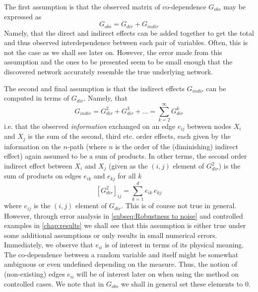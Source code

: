 \documentclass[../Thesis.tex]{subfiles}
\begin{document}
The first assumption is that the observed matrix of co-dependence $G_{obs}$ may be expressed as
\begin{equation}
    G_{obs} = G_{dir} + G_{indir}
\end{equation}
Namely, that the direct and indirect effects can be added together to get the total and thus observed interdependence between each pair of variables. Often, this is not the case as we shall see later on. However, the error made from this assumption and the ones to be presented seem to be small enough that the discovered network accurately resemble the true underlying network.

The second and final assumption is that the indirect effects $G_{indir}$ can be computed in terms of $G_{dir}$. Namely, that
\begin{equation}
    G_{indir} = G_{dir}^2 + G_{dir}^3 + \dots = \sum_{k = 2}^{\infty} G_{dir}^k
\end{equation}
i.e. that the observed \textit{information} exchanged on an edge $e_{ij}$ between nodes $X_i$ and $X_j$ is the sum of the second, third etc. order effects, each given by the information on the $n$-path (where $n$ is the order of the (diminishing) indirect effect) again assumed to be a sum of products. In other terms, the second order indirect effect between $X_i$ and $X_j$ (given as the $(i,j)$ element of $G_{dir}^2$) is the sum of products on edges $e_{ik}$ and $e_{kj}$ for all $k$
$$\left[G_{dir}^2\right]_{ij} = \sum_{k=1}^d e_{ik}\,e_{kj}$$
where $e_{ij}$ is the $(i,j)$ element of $G_{dir}$. This is of course not true in general. However, through error analysis in \autoref{subseq:Robustness to noise} and controlled examples in \autoref{chap:results} we shall see that this assumption is either true under some additional assumptions or only results in small numerical errors. Immediately, we observe that $e_{ii}$ is of interest in terms of its physical meaning. The co-dependence between a random variable and itself might be somewhat ambiguous or even undefined depending on the measure. Thus, the notion of (non-existing) edges $e_{ii}$ will be of interest later on when using the method on controlled cases. We note that in $G_{obs}$ we shall in general set these elements to $0$.
\end{document}
